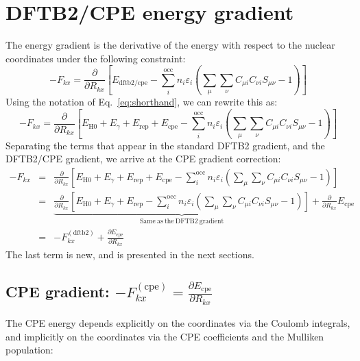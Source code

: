 \documentclass{article}
\numberwithin{equation}{section}
\begin{document}
\clearpage
\section{DFTB2/CPE energy gradient}
The energy gradient is the derivative of the energy with respect to the nuclear coordinates under the following constraint:\cite{dftb3}
\begin{equation}
    - F_{kx} = \frac{\partial}{\partial R_{kx}} \left[ E_\mathrm{{dftb2/cpe}} - \sum_i^\mathrm{occ} n_i \varepsilon_i \left(\sum_{\mu} \sum_{\nu} C_{\mu i} C_{\nu i} S_{\mu\nu} - 1  \right) \right]
\end{equation}
Using the notation of Eq.~\ref{eq:shorthand}, we can rewrite this as:
\begin{equation}
    - F_{kx} = \frac{\partial}{\partial R_{kx}} \left[  E_\mathrm{H0} + E_\gamma + E_\mathrm{rep} + E_\mathrm{cpe} - \sum_i^\mathrm{occ} n_i \varepsilon_i \left(\sum_{\mu} \sum_{\nu} C_{\mu i} C_{\nu i} S_{\mu\nu} - 1 \right) \right]
\end{equation}
Separating the terms that appear in the standard DFTB2 gradient, and the DFTB2/CPE gradient, we arrive at the CPE gradient correction:
\begin{eqnarray}
    - F_{kx} &=& \frac{\partial}{\partial R_{kx}} \left[  E_\mathrm{H0} + E_\gamma + E_\mathrm{rep}  + E_\mathrm{cpe} - \sum_i^\mathrm{occ} n_i \varepsilon_i \left(\sum_{\mu} \sum_{\nu} C_{\mu i} C_{\nu i} S_{\mu\nu} - 1 \right) \right]\nonumber\\
             &=& \underbrace{\frac{\partial}{\partial R_{kx}} \left[  E_\mathrm{H0} + E_\gamma  + E_\mathrm{rep}- \sum_i^\mathrm{occ} n_i \varepsilon_i \left(\sum_{\mu} \sum_{\nu} C_{\mu i} C_{\nu i} S_{\mu\nu} - 1 \right) \right]}_{\mathrm{Same~as~the~DFTB2~gradient}}
    +\frac{\partial}{\partial R_{kx}} E_\mathrm{cpe} \nonumber\\
    &=& -F_{kx}^\mathrm{(dftb2)} + \frac{\partial E_\mathrm{cpe}}{\partial R_{kx}}
\end{eqnarray}
The last term is new, and is presented in the next sections.

\subsection{CPE gradient: $-F_{kx}^\mathrm{(cpe)} = \frac{\partial E_\mathrm{cpe}}{\partial R_{kx}}$}
The CPE energy depends explicitly on the coordinates via the Coulomb integrals, and implicitly on the coordinates via the CPE coefficients and the Mulliken population:
\end{document}
